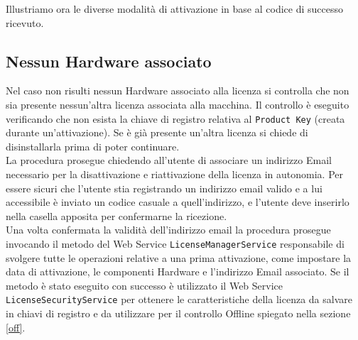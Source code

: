 Illustriamo ora le diverse modalità di attivazione in base al codice di successo ricevuto.


\subsection{Nessun Hardware associato}
\label{nha}

Nel caso non risulti nessun Hardware associato alla licenza si controlla che non sia presente nessun’altra licenza associata alla macchina. Il controllo è eseguito verificando che non esista la chiave di registro relativa al \texttt{Product Key} (creata durante un'attivazione). Se è già presente un’altra licenza si chiede di disinstallarla prima di poter continuare.
\\La procedura prosegue chiedendo all’utente di associare un indirizzo Email necessario per la disattivazione e riattivazione della licenza in autonomia. 
Per essere sicuri che l’utente stia registrando un indirizzo email valido e a lui accessibile è inviato un codice casuale a quell’indirizzo, e l’utente deve inserirlo nella casella apposita per confermarne la ricezione. 
\\Una volta confermata la validità dell'indirizzo email la procedura prosegue invocando il metodo del Web Service \texttt{LicenseManagerService} responsabile di svolgere tutte le operazioni relative a una prima attivazione, come impostare la data di attivazione, le componenti Hardware e l'indirizzo Email associato. Se il metodo è stato eseguito con successo è utilizzato il Web Service \texttt{LicenseSecurityService} per ottenere le caratteristiche della licenza da salvare in chiavi di registro e da utilizzare per il controllo Offline spiegato nella sezione \ref{off}. 


